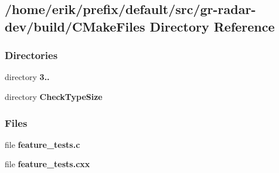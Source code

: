 \subsection{/home/erik/prefix/default/src/gr-\/radar-\/dev/build/\+C\+Make\+Files Directory Reference}
\label{dir_c5de4da6764589d3a870a25fa849f496}
\subsubsection*{Directories}
\begin{DoxyCompactItemize}
\item 
directory {\bf 3..}
\item 
directory {\bf Check\+Type\+Size}
\end{DoxyCompactItemize}
\subsubsection*{Files}
\begin{DoxyCompactItemize}
\item 
file {\bf feature\+\_\+tests.\+c}
\item 
file {\bf feature\+\_\+tests.\+cxx}
\end{DoxyCompactItemize}
